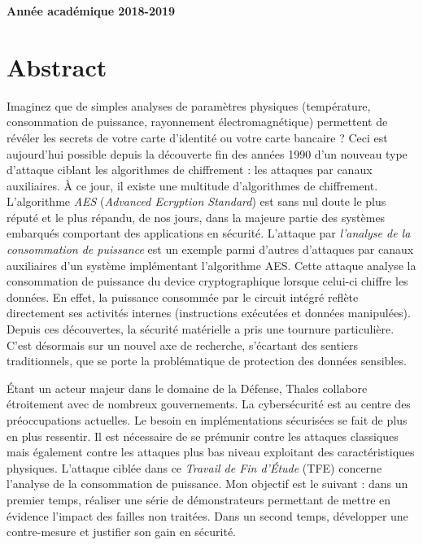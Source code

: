 \documentclass[oneside]{book}
\begin{document}
\vfill 
\centerline{\textbf{Année académique 2018-2019}}

\newpage
\strut
\thispagestyle{empty}
\newpage
\fancyfoot[C]{\thepage}

{} %
\null\vfil
\section*{\centering Abstract}

Imaginez que de simples analyses de paramètres physiques (température, consommation de puissance, rayonnement électromagnétique) permettent de révéler les secrets de votre carte d'identité ou votre carte bancaire ?  
Ceci est aujourd'hui possible depuis la découverte fin des années 1990 d'un nouveau type d'attaque ciblant les algorithmes de chiffrement : les attaques par canaux auxiliaires. À ce jour, il existe une multitude d’algorithmes de chiffrement. L’algorithme \textit{AES} (\textit{Advanced Ecryption Standard}) est sans nul doute le plus réputé et le plus répandu, de nos jours, dans la majeure partie des systèmes embarqués comportant des applications en sécurité. L'attaque par \textit{l'analyse de la consommation de puissance} est un exemple parmi d'autres d'attaques par canaux auxiliaires d'un système implémentant l'algorithme AES. Cette attaque analyse la consommation de puissance du device cryptographique lorsque celui-ci chiffre les données. En effet, la puissance consommée par le circuit intégré reflète directement ses activités internes (instructions exécutées et données manipulées). Depuis ces découvertes, la sécurité matérielle a pris une tournure particulière. C’est désormais sur un nouvel axe de recherche, s’écartant des sentiers traditionnels, que se porte la problématique de protection des données sensibles.

Étant un acteur majeur dans le domaine de la Défense, Thales collabore étroitement avec de nombreux gouvernements. La cybersécurité est au centre des préoccupations actuelles. Le besoin en implémentations sécurisées se fait de plus en plus ressentir. Il est nécessaire de se prémunir contre les attaques classiques mais également contre les attaques plus bas niveau exploitant des caractéristiques physiques. L'attaque ciblée dans ce \textit{Travail de Fin d'Étude} (TFE) concerne l'analyse de la consommation de puissance. Mon objectif est le suivant : dans un premier temps, réaliser une série de démonstrateurs permettant de mettre en évidence l'impact des failles non traitées. Dans un second temps, développer une contre-mesure et justifier son gain en sécurité.
\end{document}
